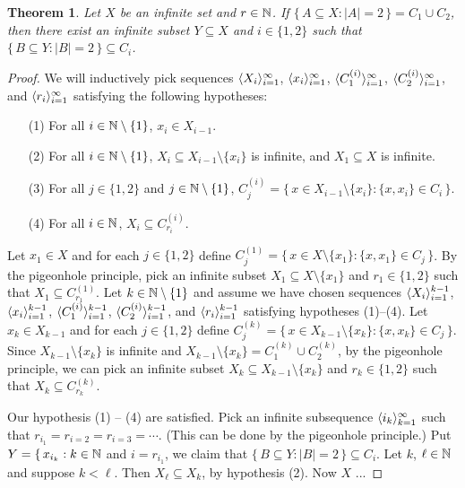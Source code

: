 \documentclass[12pt]{article}
\theoremstyle{plain}
\newtheorem{thm}{Theorem}[section]
\begin{document}
\begin{thm}
  Let $X$ be an infinite set and $r \in \mathbb{N}$.
  If $\{\, A \subseteq X : |A| = 2 \,\} = C_1 \cup C_2$, then there
  exist an infinite subset $Y \subseteq X$ and $i \in \{1, 2\}$ such
  that $\{\, B \subseteq Y : |B| = 2 \,\} \subseteq C_i$.
\end{thm}
\begin{proof}
  We will inductively pick sequences $\langle X_i \rangle_{i=1}^\infty$, $\langle
  x_i \rangle_{i=1}^\infty$, $\langle C_1^{(i)} \rangle_{i=1}^\infty$, $\langle
  C_2^{(i)} \rangle_{i=1}^\infty$, and $\langle r_i \rangle_{i=1}^\infty$
  satisfying the following hypotheses:
  \begin{itemize}
    \item[(1)] For all $i \in \mathbb{N} \setminus \{1\}$, $x_i \in X_{i-1}$.
      
    \item[(2)] For all $i \in \mathbb{N} \setminus \{1\}$, $X_i \subseteq
      X_{i-1} \setminus \{x_i\}$ is infinite, and $X_1 \subseteq X$ is
      infinite.
     
    \item[(3)] For all $j \in \{1, 2\}$ and $j \in \mathbb{N} \setminus
      \{1\}$, $C_j^{(i)} = \{\, x \in X_{i-1} \setminus \{x_i\} : \{x,
      x_i\} \in C_i \,\}$.
     
    \item[(4)] For all $i \in \mathbb{N}$, $X_i \subseteq C_{r_i}^{(i)}$.
  \end{itemize}
  Let $x_1 \in X$ and for each $j \in \{1, 2\}$ define $C^{(1)}_j =
  \bigl\{\, x \in X \setminus \{x_1\} : \{x, x_1\} \in C_j \,\bigr\}$.
  By the pigeonhole principle, pick an infinite subset $X_1 \subseteq
  X \setminus \{x_1\}$ and $r_1 \in \{1, 2\}$ such that $X_1 \subseteq
  C_{r_1}^{(1)}$. 
  Let $k \in \mathbb{N} \setminus \{1\}$ and assume we have chosen sequences
  $\langle X_i \rangle_{i=1}^{k-1}$, $\langle x_i \rangle_{i=1}^{k-1}$, $\langle C_1^{(i)}
  \rangle_{i=1}^{k-1}$, $\langle C_2^{(i)} \rangle_{i=1}^{k-1}$, and $\langle r_i \rangle_{i=1}^{k-1}$
  satisfying hypotheses (1)--(4). 
  Let $x_k \in X_{k-1}$ and for each $j \in \{1, 2\}$ define
  $C_j^{(k)} = \{\, x \in X_{k-1} \setminus \{x_k\} : \{x, x_k\} \in
  C_j \,\}$. 
  Since $X_{k-1}\setminus \{x_k\}$ is infinite and $X_{k-1}\setminus
  \{x_k\} = C_1^{(k)} \cup C_2^{(k)}$, by the pigeonhole principle, we
  can pick an infinite subset $X_k \subseteq X_{k-1} \setminus
  \{x_k\}$ and $r_k \in \{1, 2\}$ such that $X_k \subseteq
  C_{r_k}^{(k)}$.
  
  Our hypothesis (1) -- (4) are satisfied. 
  Pick an infinite subsequence $\langle i_k \rangle_{k=1}^\infty$ such that
  $r_{i_1} = r_{i=2} = r_{i=3} = \cdots$. 
  (This can be done by the pigeonhole principle.)
  Put $Y = \{\, x_{i_k} : k \in \mathbb{N}$ and $i = r_{i_1}$, we claim that
  $\{\, B \subseteq Y : |B| = 2 \,\} \subseteq C_i$.
  Let $k$, $\ell \in \mathbb{N}$ and suppose $k < \ell$. 
  Then $X_{\ell} \subseteq X_k$, by hypothesis (2).
  Now $X$ ...
\end{proof}
\end{document}
